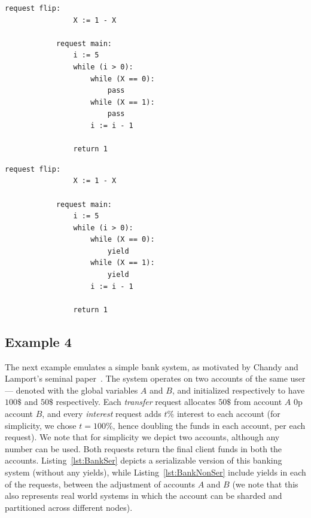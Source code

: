 \noindent
\begin{minipage}[t]{0.45\textwidth}
	\begin{lstlisting}[caption={Complex while (serializable)},
		label={lst:ComplexWhileSer}]
		    request flip: 
		        X := 1 - X 
		    
		    request main:
		        i := 5
		        while (i > 0):
		            while (X == 0):
		                pass
		            while (X == 1):
		                pass
		            i := i - 1
		        
		        return 1       
				\end{lstlisting}
\end{minipage}%
\hfill
\begin{minipage}[t]{0.45\textwidth}
	\begin{lstlisting}[caption={Complex while with yields (not serializable)},
		label={lst:ComplexWhileNonSer}]
		    request flip: 
		        X := 1 - X 
		
		    request main:
		        i := 5
		        while (i > 0):
		            while (X == 0):
		                yield
		            while (X == 1):
		                yield
		            i := i - 1
		
		        return 1        
					\end{lstlisting}
\end{minipage}
	
	
	
\subsection{Example 4}

The next example emulates a simple bank system, as motivated by Chandy and Lamport's seminal paper~\cite{ChLa85}. The system operates on two accounts of the same user --- denoted with the global variables $A$ and $B$, and initialized respectively to have $100\$$ and $50\$$ respectively. 
%
Each \textit{transfer} request allocates $50\$$ from account $A$ 0p account $B$, and every \textit{interest} request adds $t\%$ interest to each account (for simplicity, we chose $t=100\%$, hence doubling the funds in each account, per each request). We note that for simplicity we depict two accounts, although any number can be used.
%
Both requests return the final client funds in both the accounts.  
%
Listing~\ref{lst:BankSer} depicts a serializable version of this banking system (without any yields), while Listing~\ref{lst:BankNonSer} include yields in each of the requests, between the adjustment of accounts $A$ and $B$ (we note that this also represents real world systems in which the account can be sharded and partitioned across different nodes).
%


